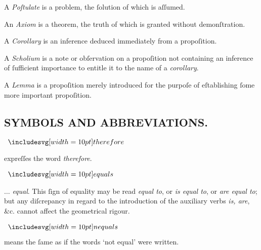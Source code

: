 A \textit{Poſtulate} is a problem, the ſolution of which is aſſumed.

An \textit{Axiom} is a theorem, the truth of which is granted without demonſtration.

A \textit{Corollary} is an inference deduced immediately from a propoſition.

A \textit{Scholium} is a note or obſervation on a propoſition not containing an inference of ſufficient importance to entitle it to the name of a \textit{corollary}.

A \textit{Lemma} is a propoſition merely introduced for the purpoſe of eſtablishing ſome more important propoſition.

\pagebreak

\subsection[Symbols and Abbreviations]{\centering \scshape{\LARGE{SYMBOLS AND ABBREVIATIONS.}}}
\label{subsec:symbolsandabbreviations}

\begin{minipage}[t]{0.20\textwidth}
  \begin{center}
    $\btherefore$
  \end{center}
\end{minipage}%
\begin{minipage}[t]{0.80\textwidth}
  expreſſes the word \textit{therefore}.
\end{minipage}

\begin{minipage}[t]{0.20\textwidth}
  \begin{center}
    $\bequals$
  \end{center}
\end{minipage}%
\begin{minipage}[t]{0.80\textwidth}
  $\ldots$ \textit{equal}. This ſign of equality may be read \textit{equal to}, or \textit{is equal to}, or \textit{are equal to}; but any diſcrepancy in regard to the introduction of the auxiliary verbs \textit{is, are}, \&c. cannot affect the geometrical rigour.
\end{minipage}

\begin{minipage}[t]{0.20\textwidth}
  \begin{center}
    $\bnequals$
  \end{center}
\end{minipage}%
\begin{minipage}[t]{0.80\textwidth}
  means the ſame as if the words ‘not equal’ were written.
\end{minipage}


